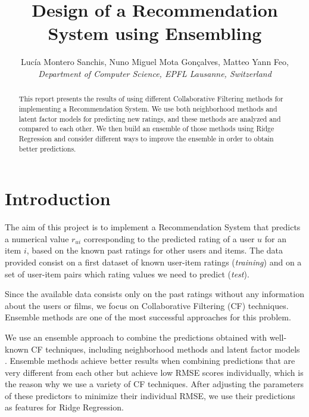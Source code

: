 \documentclass[10pt,conference,compsocconf]{IEEEtran}
\begin{document}
\title{Design of a Recommendation System using Ensembling}

\author{
  Luc\'{i}a Montero Sanchis, Nuno Miguel Mota Gon\c{c}alves, Matteo Yann Feo,  \\
  \textit{Department of Computer Science, EPFL Lausanne, Switzerland}
}

\maketitle

\begin{abstract}
  This report presents the results of using different Collaborative Filtering methods for implementing a Recommendation System. We use both neighborhood methods and latent factor models for predicting new ratings, and these methods are analyzed and compared to each other. We then build an ensemble of those methods using Ridge Regression and consider different ways to improve the ensemble in order to obtain better predictions.
\end{abstract}

\section{Introduction}
	The aim of this project is to implement a Recommendation System that predicts a numerical value $r_{ui}$ corresponding to the predicted rating of a user $u$ for an item $i$, based on the known past ratings for other users and items. The data provided consist on a first dataset of known user-item ratings (\emph{training}) and on a set of user-item pairs which rating values we need to predict (\emph{test}).

  Since the available data consists only on the past ratings without any information about the users or films, we focus on Collaborative Filtering (CF) techniques. Ensemble methods are one of the most successful approaches for this problem.

  We use an ensemble approach to combine the predictions obtained with well-known CF techniques, including neighborhood methods and latent factor models \cite{koren2009matrix}. Ensemble methods achieve better results when combining predictions that are very different from each other but achieve low RMSE scores individually, which is the reason why we use a variety of CF techniques. After adjusting the parameters of these predictors to minimize their individual RMSE, we use their predictions as features for Ridge Regression.
\end{document}
